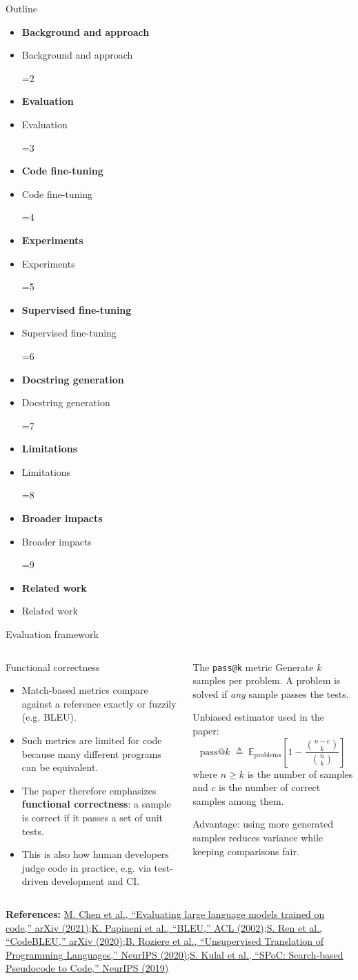 \documentclass[aspectratio=43,9pt]{beamer}
\newcommand{\srclink}[2]{\href{#2}{\textcolor{black!68}{#1}}}
\newcommand{\sep}{;\hspace{0.35em}}
\newcommand{\refline}[2][References]{%
  \vfill
  {\raggedright\fontsize{5.1}{5.5}\selectfont\color{black!68}\textbf{#1:} #2\par}%
}
\newcommand{\srcChen}{\srclink{M. Chen et al., ``Evaluating large language models trained on code,'' arXiv (2021)}{https://arxiv.org/abs/2107.03374}}
\newcommand{\srcPapineni}{\srclink{K. Papineni et al., ``BLEU,'' ACL (2002)}{https://aclanthology.org/P02-1040/}}
\newcommand{\srcRen}{\srclink{S. Ren et al., ``CodeBLEU,'' arXiv (2020)}{https://arxiv.org/abs/2009.10297}}
\newcommand{\srcRoziere}{\srclink{B. Roziere et al., ``Unsupervised Translation of Programming Languages,'' NeurIPS (2020)}{https://arxiv.org/abs/2006.03511}}
\newcommand{\srcKulal}{\srclink{S. Kulal et al., ``SPoC: Search-based Pseudocode to Code,'' NeurIPS (2019)}{https://arxiv.org/abs/1906.04908}}
\newcommand{\outlineitem}[2]{%
  \ifnum\currentstage=#1\relax
    \item[{\textcolor{black}{\large\textbullet}}] {\color{black}\bfseries #2}
  \else
    \item[{\textcolor{black}{\large\textbullet}}] {\color{black!70}#2}
  \fi
}
\newcommand{\outlineframe}[1]{%
\begin{frame}{Outline}
\small
\def\currentstage{#1}
\begin{itemize}
  \setlength{\itemsep}{0.45em}
  \outlineitem{1}{Background and approach}
  \outlineitem{2}{Evaluation}
  \outlineitem{3}{Code fine-tuning}
  \outlineitem{4}{Experiments}
  \outlineitem{5}{Supervised fine-tuning}
  \outlineitem{6}{Docstring generation}
  \outlineitem{7}{Limitations}
  \outlineitem{8}{Broader impacts}
  \outlineitem{9}{Related work}
\end{itemize}
\end{frame}
}
\begin{document}
\outlineframe{2}

\begin{frame}{Evaluation framework}
\scriptsize
\begin{columns}[T,totalwidth=\textwidth]
\begin{block}{Functional correctness}
\begin{itemize}
  \item Match-based metrics compare against a reference exactly or fuzzily (e.g. BLEU).
  \item Such metrics are limited for code because many different programs can be equivalent.
  \item The paper therefore emphasizes \textbf{functional correctness}: a sample is correct if it passes a set of unit tests.
  \item This is also how human developers judge code in practice, e.g. via test-driven development and CI.
\end{itemize}
\end{block}

\begin{block}{The \texttt{pass@k} metric}
Generate \(k\) samples per problem. A problem is solved if \emph{any} sample passes the tests.

\vspace{0.4em}
Unbiased estimator used in the paper:
\[
\mathrm{pass@}k \;\triangleq\; \mathbb{E}_{\text{problems}}\!\left[1 - \frac{\binom{n-c}{k}}{\binom{n}{k}}\right]
\]
where \(n \ge k\) is the number of samples and \(c\) is the number of correct samples among them.

Advantage: using more generated samples reduces variance while keeping comparisons fair.
\end{block}
\end{columns}

\refline{\srcChen\sep \srcPapineni\sep \srcRen\sep \srcRoziere\sep \srcKulal}
\end{frame}
\end{document}
